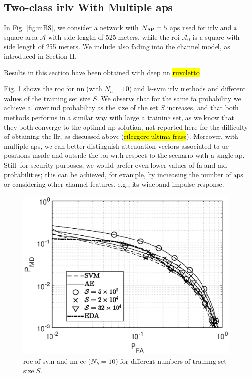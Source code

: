 \documentclass[draftcls,onecolumn,12pt]{IEEEtran}
\begin{document}
\subsection{Two-class \ac{irlv} With Multiple \acp{ap}}
\label{sec:res_fading}


In Fig. \ref{fig:mBS}, we consider a network with $N_{\rm AP}=5$ \acp{ap} used for \ac{irlv} and a square area $\mathcal A$ with side length of 525 meters, while the \ac{roi} $\mathcal A_0$ is a square with side length of 255 meters. 
We include also fading into the channel model, as introduced in Section II.

\underline{Results in this section have been obtained with deep \ac{nn}} \hl{ruvoletto} 

Fig. \ref{fig:kf1} shows the \ac{roc} for \ac{nn}  (with $N_h = 10$) and \ac{ls}-\ac{svm} \ac{irlv} methods and different values of the training set size $S$. We observe that for the same  \ac{fa} probability  we achieve a lower \ac{md} probability as the size of the set $S$ increases, and that both methods performs in a similar way with large a training set, as we know that they both converge to the optimal \ac{np} solution, not reported here for the difficulty of obtaining the \ac{llr}, as discussed above (\hl{rileggere ultima frase}). Moreover, with multiple \acp{ap}, we can better distinguish attenuation vectors associated to \ac{ue} positions inside and outside the \ac{roi} with respect to the scenario with a single \ac{ap}. Still, for security purposes, we would prefer even lower values of \ac{fa} and \ac{md} probabilities; this can be achieved, for example, by increasing the number of \acp{ap} or considering other channel features, e.g., its wideband impulse response. 


\begin{figure}[t]
    \centering
    \includegraphics[width=0.6\columnwidth]{res_training_10BS_2Class.eps}
    \caption{\ac{roc} of \ac{svm} and \ac{nn}-\ac{ce} ($N_h = 10$) for different numbers of training set size $S$.}
    \label{fig:kf1}
\end{figure}
\end{document}
